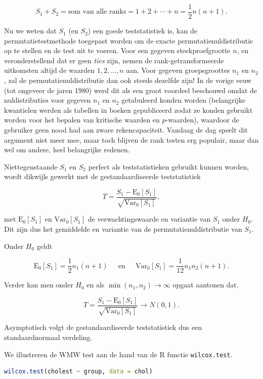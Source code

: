 \documentclass[
  12pt,dutch,coursenotes]{book}
\newcommand{\passthrough}[1]{#1}
\begin{document}
\[
  S_1+S_2 = \text{som van alle ranks} = 1+2+\cdots + n=\frac{1}{2}n(n+1).
\]

Nu we weten dat \(S_1\) (en \(S_2\)) een goede teststatistiek is, kan de permutatietestmethode toegepast worden om de exacte permutatienuldistributie op te stellen en de test uit te voeren.
Voor een gegeven steekproefgrootte \(n\), en veronderstellend dat er geen \emph{ties} zijn, nemen de rank-getransformeerde uitkomsten altijd de waarden \(1, 2, \ldots, n\) aan. Voor gegeven groepsgroottes \(n_1\) en \(n_2\), zal de permutatienuldistributie dan ook steeds dezelfde zijn! In de vorige eeuw (tot ongeveer de jaren 1980) werd dit als een groot voordeel beschouwd omdat de nuldistributies voor gegeven \(n_1\) en \(n_2\) getabuleerd konden worden (belangrijke kwantielen werden als tabellen in boeken gepubliceerd zodat ze konden gebruikt worden voor het bepalen van kritische waarden en \(p\)-waarden), waardoor de gebruiker geen nood had aan zware rekencapaciteit. Vandaag de dag speelt dit argument niet meer mee, maar toch blijven de rank testen erg populair, maar dan wel om andere, heel belangrijke redenen.

Niettegenstaande \(S_1\) en \(S_2\) perfect als teststatistieken gebruikt kunnen worden, wordt dikwijls gewerkt met de gestandaardiseerde teststatistiek

\[
  T = \frac{S_1-\text{E}_{0}\left[S_1\right]}{\sqrt{\text{Var}_{0}\left[S_1\right]}},
\]

met \(\text{E}_{0}\left[S_1\right]\) en \(\text{Var}_{0}\left[S_1\right]\) de verwachtingswaarde en variantie van \(S_1\) onder \(H_0\). Dit zijn dus het gemiddelde en variantie van de permutatienuldistributie van \(S_1\).

Onder \(H_0\) geldt

\[
   \text{E}_{0}\left[S_1\right]= \frac{1}{2}n_1(n+1) \;\;\;\;\text{ en }\;\;\;\; \text{Var}_{0}\left[S_1\right]=\frac{1}{12}n_1n_2(n+1).
 \]

Verder kan men onder \(H_0\) en als \(\min(n_1,n_2)\rightarrow \infty\) opgaat aantonen dat,

\[
    T = \frac{S_1-\text{E}_{0}\left[S_1\right]}{\sqrt{\text{Var}_{0}\left[S_1\right]}} \rightarrow N(0,1).  
 \]

Asymptotisch volgt de gestandaardiseerde teststatistiek dus een standaardnormaal verdeling.

We illustreren de WMW test aan de hand van de R functie \passthrough{\lstinline!wilcox.test!}.

\begin{lstlisting}[language=R]
wilcox.test(cholest ~ group, data = chol)
\end{lstlisting}
\end{document}
